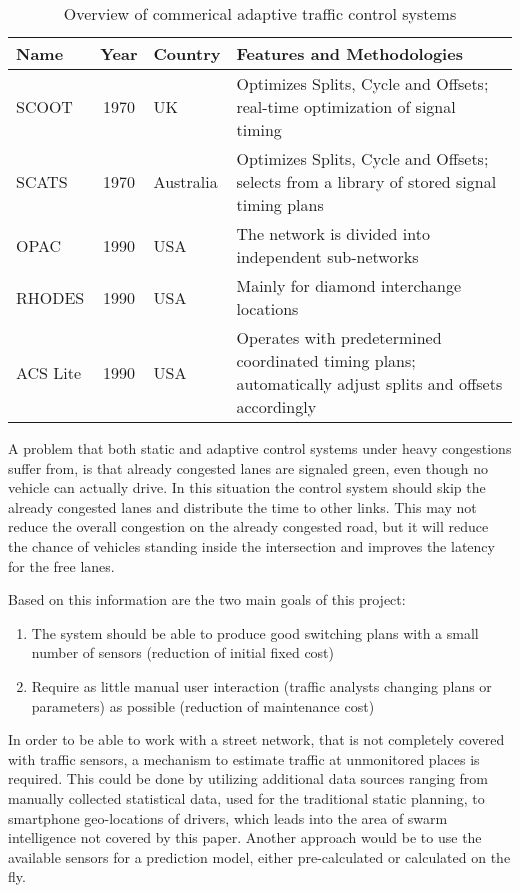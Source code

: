 \begin{table}[ht!]
	\centering
	\begin{tabular}{l|cl|p{9cm}}
		Name & Year & Country & Features and Methodologies \\
		\hline\hline
		SCOOT & 1970 & UK & Optimizes Splits, Cycle and Offsets; real-time optimization of signal timing \\
		\hline
		SCATS & 1970 & Australia & Optimizes Splits, Cycle and Offsets; selects from a library of stored signal timing plans \\
		\hline
		OPAC & 1990 & USA & The network is divided into independent sub-networks \\
		\hline
		RHODES & 1990 & USA & Mainly for diamond interchange locations \\
		\hline
		ACS Lite & 1990 & USA & Operates with predetermined coordinated timing plans; automatically adjust splits and offsets accordingly \\
	\end{tabular}
	\label{atcs_overview}
	\caption{Overview of commerical adaptive traffic control systems}
\end{table}

A problem that both static and adaptive control systems under heavy congestions suffer from, is that already congested lanes are signaled green, even though no vehicle can actually drive. In this situation the control system should skip the already congested lanes and distribute the time to other links. This may not reduce the overall congestion on the already congested road, but it will reduce the chance of vehicles standing inside the intersection and improves the latency for the free lanes.

Based on this information are the two main goals of this project:

\begin{enumerate}
	\item The system should be able to produce good switching plans with a small number of sensors (reduction of initial fixed cost)
	\item Require as little manual user interaction (traffic analysts changing plans or parameters) as possible (reduction of maintenance cost)
\end{enumerate}

In order to be able to work with a street network, that is not completely covered with traffic sensors, a mechanism to estimate traffic at unmonitored places is required. This could be done by utilizing additional data sources ranging from manually collected statistical data, used for the traditional static planning, to smartphone geo-locations of drivers, which leads into the area of swarm intelligence not covered by this paper. Another approach would be to use the available sensors for a prediction model, either pre-calculated or calculated on the fly.

